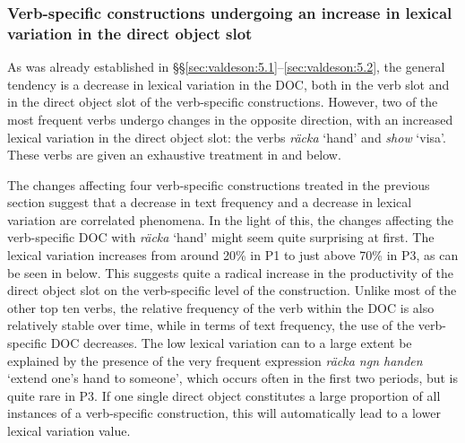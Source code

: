 \documentclass[output=paper]{langscibook}
\begin{document}
\subsubsection{Verb-specific constructions undergoing an increase in lexical variation in the direct object slot}\label{sec:valdeson:5.3.2}


As was already established in §§\ref{sec:valdeson:5.1}--\ref{sec:valdeson:5.2}, the general tendency is a decrease in lexical variation in the DOC, both in the verb slot and in the direct object slot of the verb-specific constructions. However, two of the most frequent verbs undergo changes in the opposite direction, with an increased lexical variation in the direct object slot: the verbs \textit{räcka} ‘hand’ and \textit{show} ‘visa’. These verbs are given an exhaustive treatment in  and  below.



\label{sec:valdeson:5.3.2.1}
The changes affecting four verb-specific constructions treated in the previous section suggest that a decrease in text frequency and a decrease in lexical variation are correlated phenomena. In the light of this, the changes affecting the verb-specific DOC with \textit{räcka} ‘hand’ might seem quite surprising at first. The lexical variation increases from around 20\% in P1 to just above 70\% in P3, as can be seen in  below. This suggests quite a radical increase in the productivity of the direct object slot on the verb-specific level of the construction. Unlike most of the other top ten verbs, the relative frequency of the verb within the DOC is also relatively stable over time, while in terms of text frequency, the use of the verb-specific DOC decreases. The low lexical variation can to a large extent be explained by the presence of the very frequent expression \textit{räcka ngn handen} ‘extend one's hand to someone’, which occurs often in the first two periods, but is quite rare in P3. If one single direct object constitutes a large proportion of all instances of a verb-specific construction, this will automatically lead to a lower lexical variation value.


\begin{table}
\caption{Frequency measures of the verb-specific DOC with \textit{räcka} ‘hand’}
\label{tab:valdeson:12}
\end{table}
\end{document}

